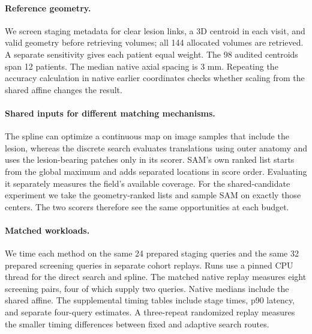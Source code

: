 \paragraph{Reference geometry.}
We screen staging metadata for clear lesion links, a 3D centroid in each visit, and valid geometry before retrieving volumes; all 144 allocated volumes are retrieved. A separate sensitivity gives each patient equal weight. The 98 audited centroids span 12 patients. The median native axial spacing is 3 mm. Repeating the accuracy calculation in native earlier coordinates checks whether scaling from the shared affine changes the result.

\paragraph{Shared inputs for different matching mechanisms.}
The spline can optimize a continuous map on image samples that include the lesion, whereas the discrete search evaluates translations using outer anatomy and uses the lesion-bearing patches only in its scorer. SAM's own ranked list starts from the global maximum and adds separated locations in score order. Evaluating it separately measures the field's available coverage. For the shared-candidate experiment we take the geometry-ranked lists and sample SAM on exactly those centers. The two scorers therefore see the same opportunities at each budget.

\paragraph{Matched workloads.}
We time each method on the same 24 prepared staging queries and the same 32 prepared screening queries in separate cohort replays. Runs use a pinned CPU thread for the direct search and spline. The matched native replay measures eight screening pairs, four of which supply two queries. Native medians include the shared affine. The supplemental timing tables include stage times, p90 latency, and separate four-query estimates. A three-repeat randomized replay measures the smaller timing differences between fixed and adaptive search routes.
